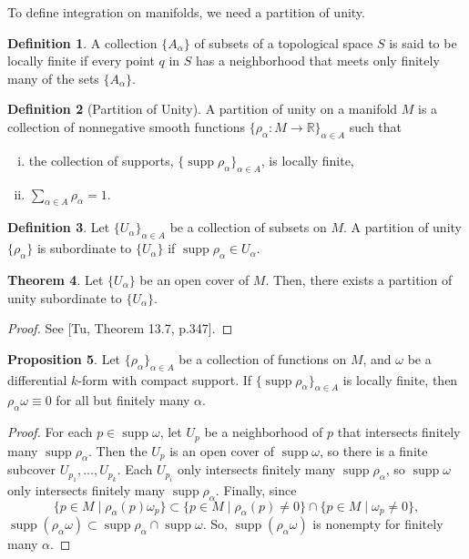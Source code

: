 \documentclass[]{article}
\DeclareMathOperator{\supp}{supp}
\theoremstyle{definition}
\newtheorem{theorem}{Theorem}[section] %
\theoremstyle{definition}
\newtheorem{definition}[theorem]{Definition} %
\newtheorem{proposition}[theorem]{Proposition}
\begin{document}
To define integration on manifolds, we need a partition of unity.

\begin{definition}
    A collection $\{A_\alpha \}$ of subsets of a topological space $S$ is said to be locally finite if every point $q$ in $S$ has a neighborhood that meets only finitely many of the sets $\{A_\alpha \}$.
\end{definition}

\begin{definition}[Partition of Unity]
    A partition of unity on a manifold $M$ is a collection of nonnegative smooth functions $\{\rho_\alpha:M \rightarrow \mathbb{R}\}_{\alpha\in A}$ such that
    \begin{enumerate}[(i)]
        \item the collection of supports, $\{\supp\rho_\alpha\}_{\alpha\in A}$, is locally finite,
        \item $\sum_{\alpha\in A} \rho_\alpha = 1.$
    \end{enumerate}
\end{definition}

\begin{definition}
    Let $\{U_\alpha\}_{\alpha\in A}$ be a collection of subsets on $M$. A partition of unity $\{\rho_\alpha\}$ is subordinate to $\{U_\alpha\}$ if $\supp\rho_\alpha\in U_\alpha$.
\end{definition}

\begin{theorem}
    Let $\{U_\alpha\}$ be an open cover of $M$. Then, there exists a partition of unity subordinate to $\{U_\alpha\}$.
\end{theorem}
\begin{proof}
    See [Tu, Theorem 13.7, p.347].
\end{proof}

\begin{proposition}
\label{finiteforms}
    Let $\{\rho_\alpha\}_{\alpha\in A}$ be a collection of functions on $M$, and $\omega$ be a differential $k$-form with compact support. If $\{\supp \rho_\alpha\}_{\alpha\in A}$ is locally finite, then $\rho_\alpha\omega\equiv0$ for all but finitely many $\alpha$.
\end{proposition}

\begin{proof}
    For each $p\in \supp\omega$, let $U_p$ be a neighborhood of $p$ that intersects finitely many $\supp\rho_\alpha$. Then the $U_p$ is an open cover of $\supp\omega$, so there is a finite subcover $U_{p_1}, \dots, U_{p_k}$. Each $U_{p_i}$ only intersects finitely many $\supp\rho_\alpha$, so $\supp\omega$ only intersects finitely many $\supp\rho_\alpha$. Finally, since \[\{p\in M\mid \rho_\alpha(p)\omega_p\}\subset\{p\in M\mid \rho_\alpha(p)\neq 0\}\cap \{p\in M\mid \omega_p\neq 0\},\] $\supp(\rho_\alpha\omega)\subset \supp\rho_\alpha\cap \supp\omega$. So, $\supp(\rho_\alpha\omega)$ is nonempty for finitely many $\alpha$.
\end{proof}
\end{document}

